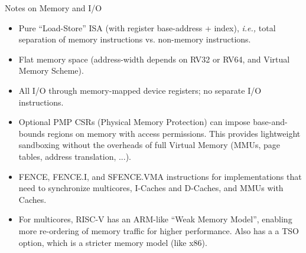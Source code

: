 \documentclass{article}
\newcommand{\ie}{\emph{i.e.,}}
\begin{document}
\begin{center}
  {\Huge
    Notes on Memory and I/O}

  \vspace*{0.5in}

  \begin{minipage}{9in}\LARGE
    \begin{itemize}

    \item Pure ``Load-Store'' ISA (with register base-address +
      index), {\ie} total separation of memory instructions
      vs. non-memory instructions.

    \item Flat memory space (address-width depends on RV32 or RV64, and Virtual Memory Scheme).

    \item All I/O through memory-mapped device registers; no separate I/O instructions.

    \item Optional PMP CSRs (Physical Memory Protection) can impose
      base-and-bounds regions on memory with access permissions.  This
      provides lightweight sandboxing without the overheads of full
      Virtual Memory (MMUs, page tables, address translation, ...).

    \item FENCE, FENCE.I, and SFENCE.VMA instructions for
      implementations that need to synchronize multicores, I-Caches
      and D-Caches, and MMUs with Caches.

    \item For multicores, RISC-V has an ARM-like ``Weak Memory
      Model'', enabling more re-ordering of memory traffic for higher
      performance.  Also has a a TSO option, which is a stricter
      memory model (like x86).

    \end{itemize}
  \end{minipage}
\end{center}

\clearpage

\end{document}
